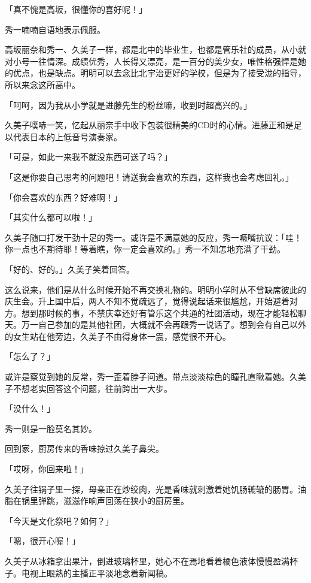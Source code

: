 \documentclass[UTF8]{ctexart}
\begin{document}
    「真不愧是高坂，很懂你的喜好呢！」 

    秀一喃喃自语地表示佩服。 

    高坂丽奈和秀一、久美子一样，都是北中的毕业生，也都是管乐社的成员，从小就对小号一往情深。成绩优秀，人长得又漂亮，是一百分的美少女，唯性格强悍是她的优点，也是缺点。明明可以去念比北宇治更好的学校，但是为了接受泷的指导，所以来念这所高中。 

    「呵呵，因为我从小学就是进藤先生的粉丝嘛，收到时超高兴的。」 

    久美子噗哧一笑，忆起从丽奈手中收下包装很精美的CD时的心情。进藤正和是足以代表日本的上低音号演奏家。 

    「可是，如此一来我不就没东西可送了吗？」 

    「这是你要自己思考的问题吧！请送我会喜欢的东西，这样我也会考虑回礼。」 

    「你会喜欢的东西？好难啊！」 

    「其实什么都可以啦！」 

    久美子随口打发干劲十足的秀一。或许是不满意她的反应，秀一噘嘴抗议：「哇！你一点也不期待耶！等着瞧，你一定会喜欢的。」秀一不知怎地充满了干劲。 

    「好的、好的。」久美子笑着回答。 

    这么说来，他们是从什么时候开始不再交换礼物的。明明小学时从不曾缺席彼此的庆生会。升上国中后，两人不知不觉疏远了，觉得说起话来很尴尬，开始避着对方。想到那时候的事，不禁庆幸还好有管乐这个共通的社团活动，现在才能轻松聊天。万一自己参加的是其他社团，大概就不会再跟秀一说话了。想到会有自己以外的女生站在他旁边，久美子不由得身体一震，感觉很不开心。 

    「怎么了？」 

    或许是察觉到她的反常，秀一歪着脖子问道。带点淡淡棕色的瞳孔直瞅着她。久美子不想老实回答这个问题，往前跨出一大步。 

    「没什么！」 

    秀一则是一脸莫名其妙。 

    回到家，厨房传来的香味掠过久美子鼻尖。 

    「哎呀，你回来啦！」 

    久美子往锅子里一探，母亲正在炒绞肉，光是香味就刺激着她饥肠辘辘的肠胃。油脂在锅里弹跳，滋滋作响声回荡在狭小的厨房里。 

    「今天是文化祭吧？如何？」 

    「嗯，很开心喔！」 

    久美子从冰箱拿出果汁，倒进玻璃杯里，她心不在焉地看着橘色液体慢慢盈满杯子。电视上眼熟的主播正平淡地念着新闻稿。 
\end{document}
